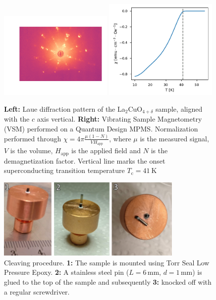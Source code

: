 \begin{figure}
    \centering
    \includegraphics[width=0.49\textwidth]{fig/arpes/laue2.png}
    \includegraphics[width=0.49\textwidth]{fig/arpes/vsm_lcoo.pdf}
    \caption{\textbf{Left:} Laue diffraction pattern of the La$_2$CuO$_{4+\delta}$ sample, aligned with the $c$ axis vertical. \textbf{Right:} Vibrating Sample Magnetometry (VSM) performed on a Quantum Design MPMS. Normalization performed through $\chi=4\pi \frac{\mu(1-N)}{VH_\text{app}}$, where $\mu$ is the measured signal, $V$ is the volume, $H_\text{app}$ is the applied field and $N$ is the demagnetization factor. Vertical line marks the onset superconducting transition temperature $T_\text{c} = \SI{41}{\kelvin}$}
    \label{fig:arpes_vsm}
\end{figure}

\begin{figure}
    \centering
    \includegraphics[width=0.8\textwidth]{fig/arpes/cleave.png}
    \caption{Cleaving procedure. \textbf{1:} The sample is mounted using Torr Seal Low Pressure Epoxy. \textbf{2:} A stainless steel pin ($L=6\,\text{mm}$, $d=1\,\text{mm}$) is glued to the top of the sample and subsequently \textbf{3:} knocked off with a regular screwdriver.}
    \label{fig:arpes_cleave}
\end{figure}


